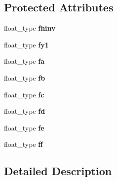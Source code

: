 \subsection*{Protected Attributes}
\begin{DoxyCompactItemize}
\item 
\hypertarget{classc2__connector__function__p_aa9bafcf757d0607f897ab5e7d0acfb72}{float\-\_\-type {\bfseries fhinv}}\label{classc2__connector__function__p_aa9bafcf757d0607f897ab5e7d0acfb72}

\item 
\hypertarget{classc2__connector__function__p_a1e6f14a7d716a5915adf1985bbdc4c52}{float\-\_\-type {\bfseries fy1}}\label{classc2__connector__function__p_a1e6f14a7d716a5915adf1985bbdc4c52}

\item 
\hypertarget{classc2__connector__function__p_a3057f77c22dc61e93a1a3485780dd93f}{float\-\_\-type {\bfseries fa}}\label{classc2__connector__function__p_a3057f77c22dc61e93a1a3485780dd93f}

\item 
\hypertarget{classc2__connector__function__p_a3eff36726d4717fca41848605cd53916}{float\-\_\-type {\bfseries fb}}\label{classc2__connector__function__p_a3eff36726d4717fca41848605cd53916}

\item 
\hypertarget{classc2__connector__function__p_a0f0edb256a18551e2d054e47487d5b1d}{float\-\_\-type {\bfseries fc}}\label{classc2__connector__function__p_a0f0edb256a18551e2d054e47487d5b1d}

\item 
\hypertarget{classc2__connector__function__p_a2d06e77813b110a2c6ce09399d246704}{float\-\_\-type {\bfseries fd}}\label{classc2__connector__function__p_a2d06e77813b110a2c6ce09399d246704}

\item 
\hypertarget{classc2__connector__function__p_a64b954176b723477abf827e67bcfb7e7}{float\-\_\-type {\bfseries fe}}\label{classc2__connector__function__p_a64b954176b723477abf827e67bcfb7e7}

\item 
\hypertarget{classc2__connector__function__p_a39ca7caba5b003e6684eaf6c80920a8a}{float\-\_\-type {\bfseries ff}}\label{classc2__connector__function__p_a39ca7caba5b003e6684eaf6c80920a8a}

\end{DoxyCompactItemize}


\subsection{Detailed Description}
